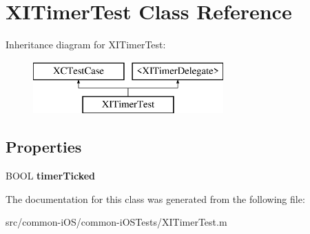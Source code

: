 \hypertarget{interface_x_i_timer_test}{}\section{X\+I\+Timer\+Test Class Reference}
\label{interface_x_i_timer_test}
Inheritance diagram for X\+I\+Timer\+Test\+:\begin{figure}[H]
\begin{center}
\leavevmode
\includegraphics[height=2.000000cm]{interface_x_i_timer_test}
\end{center}
\end{figure}
\subsection*{Properties}
\begin{DoxyCompactItemize}
\item 
\hypertarget{interface_x_i_timer_test_a1984f4df36b0d98df2a3eb012e7112e1}{}\label{interface_x_i_timer_test_a1984f4df36b0d98df2a3eb012e7112e1} 
B\+O\+OL {\bfseries timer\+Ticked}
\end{DoxyCompactItemize}


The documentation for this class was generated from the following file\+:\begin{DoxyCompactItemize}
\item 
src/common-\/i\+O\+S/common-\/i\+O\+S\+Tests/X\+I\+Timer\+Test.\+m\end{DoxyCompactItemize}
